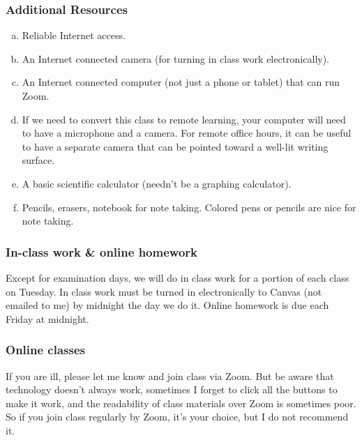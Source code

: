 \documentclass[12pt]{article}
\newcounter{ex}\setcounter{ex}{0}
\newenvironment{alphalist}{
  \begin{enumerate}[(a)]
    \addtolength{\itemsep}{-0.5\itemsep}}
  {\end{enumerate}}
\begin{document}
\newpage

\subsubsection*{Additional Resources}

\begin{alphalist}


\item Reliable Internet access.

\item An Internet connected camera (for turning in class work electronically).

\item  An Internet connected computer (not just a phone or tablet) that can run Zoom. 

\item If we need to convert this class to remote learning, your computer will need to have a microphone and a camera. For remote office hours, it can be useful to have a separate camera that can be pointed toward a well-lit writing surface.

\item A basic scientific calculator (needn't be a graphing calculator).

\item Pencils, erasers, notebook for note taking. Colored pens or pencils are nice for note taking.

\end{alphalist}



\subsubsection*{In-class work \& online homework}

Except for examination days, we will do in class work for a portion 
of each class on Tuesday. In class work must be turned in 
electronically to Canvas (not emailed to me) by midnight the day we 
do it. Online homework is due each Friday at midnight. 

\subsubsection*{Online classes}

If you are ill, please let me know and join class via Zoom. But 
be aware that technology doesn't always work, sometimes I forget to 
click all the buttons to make it work, and the readability of class 
materials over Zoom is sometimes poor. So if you join class regularly 
by Zoom, it's your choice, but I do not recommend it. 
\end{document}
